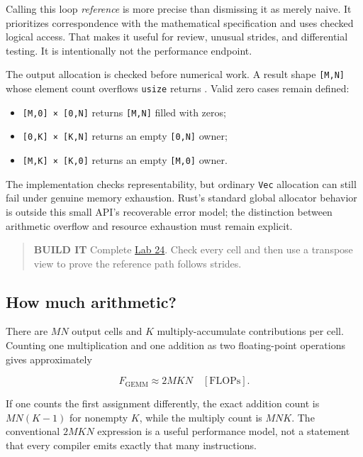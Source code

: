 \documentclass[
  10pt,
]{article}
\newcounter{none} %
\providecommand{\tightlist}{%
  \setlength{\itemsep}{0pt}\setlength{\parskip}{0pt}}
\begin{document}
Calling this loop \emph{reference} is more precise than dismissing it as
merely naive. It prioritizes correspondence with the mathematical
specification and uses checked logical access. That makes it useful for
review, unusual strides, and differential testing. It is intentionally
not the performance endpoint.

The output allocation is checked before numerical work. A result shape
\texttt{{[}M,N{]}} whose element count overflows \texttt{usize} returns
\texttt{}. Valid zero cases remain
defined:

\begin{itemize}
\tightlist
\item
  \texttt{{[}M,0{]}\ ×\ {[}0,N{]}} returns \texttt{{[}M,N{]}} filled
  with zeros;
\item
  \texttt{{[}0,K{]}\ ×\ {[}K,N{]}} returns an empty \texttt{{[}0,N{]}}
  owner;
\item
  \texttt{{[}M,K{]}\ ×\ {[}K,0{]}} returns an empty \texttt{{[}M,0{]}}
  owner.
\end{itemize}

The implementation checks representability, but ordinary \texttt{Vec}
allocation can still fail under genuine memory exhaustion. Rust's
standard global allocator behavior is outside this small API's
recoverable error model; the distinction between arithmetic overflow and
resource exhaustion must remain explicit.

\begin{quote}
\textbf{BUILD IT} Complete
\href{https://github.com/hermonai/inside-the-llm-engine/blob/astra-visual-rewrite/labs/lab-24-gemm-by-hand.md}{Lab
24}. Check every cell and then use a transpose view to prove the
reference path follows strides.
\end{quote}

\subsection{How much arithmetic?}\label{how-much-arithmetic}

There are \(MN\) output cells and \(K\) multiply-accumulate
contributions per cell. Counting one multiplication and one addition as
two floating-point operations gives approximately

\[
F_{\mathrm{GEMM}}\approx2MKN\quad[\mathrm{FLOPs}].
\]

If one counts the first assignment differently, the exact addition count
is \(MN(K-1)\) for nonempty \(K\), while the multiply count is \(MNK\).
The conventional \(2MKN\) expression is a useful performance model, not
a statement that every compiler emits exactly that many instructions.
\end{document}

